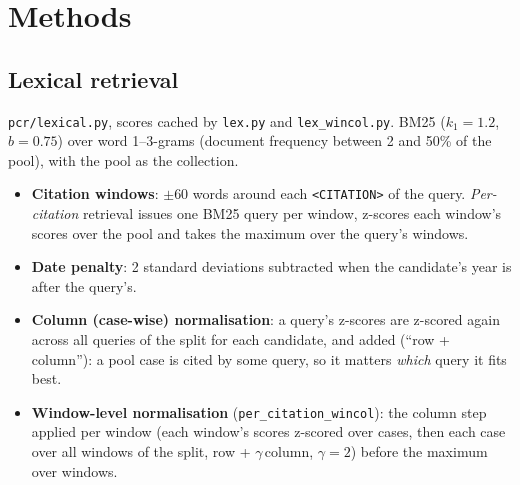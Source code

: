\documentclass[11pt,a4paper]{article}
\newcommand{\code}[1]{\texttt{\small #1}}
\begin{document}
\section{Methods}
\subsection{Lexical retrieval}\label{sec:lex}
\code{pcr/lexical.py}, scores cached by \code{lex.py} and \code{lex\_wincol.py}.  BM25 ($k_1=1.2$, $b=0.75$)
over word 1--3-grams (document frequency between 2 and 50\% of the pool), with the pool as the collection.
\begin{itemize}
  \item \textbf{Citation windows}: $\pm60$ words around each \code{<CITATION>} of the query.  \emph{Per-citation}
  retrieval issues one BM25 query per window, z-scores each window's scores over the pool and takes the maximum
  over the query's windows.
  \item \textbf{Date penalty}: 2 standard deviations subtracted when the candidate's year is after the query's.
  \item \textbf{Column (case-wise) normalisation}: a query's z-scores are z-scored again across all queries of
  the split for each candidate, and added (``row + column''): a pool case is cited by some query, so it matters
  \emph{which} query it fits best.
  \item \textbf{Window-level normalisation} (\code{per\_citation\_wincol}): the column step applied per window
  (each window's scores z-scored over cases, then each case over all windows of the split, row + $\gamma\,$column,
  $\gamma=2$) before the maximum over windows.
\end{itemize}
\end{document}
